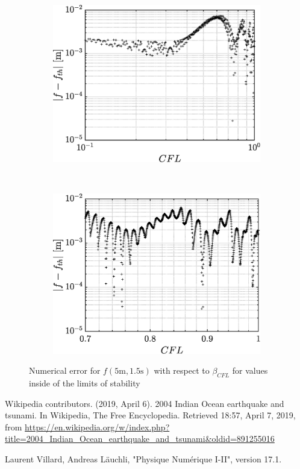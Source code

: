 \documentclass[a4paper,12pt,twoside]{article}
\begin{document}
    \begin{figure}[h]
     \begin{subfigure}{0.5\textwidth}
     \includegraphics[width=\textwidth]{graphs/convCFL01.eps}
     \end{subfigure}
     ~
     \begin{subfigure}{0.5\textwidth}
     \includegraphics[width=\textwidth]{graphs/convCFL01zoom.eps}
     \end{subfigure}
     \caption{Numerical error for $f(5\text{m},1.5\text{s})$ with respect to $\beta_{CFL}$ for values inside of the limits of stability}
     \label{fig:stable}

    \end{figure}




  \newpage
  \begin{thebibliography}{99}
     Wikipedia contributors. (2019, April 6). 2004 Indian Ocean earthquake and tsunami. In Wikipedia, The Free Encyclopedia. Retrieved 18:57, April 7, 2019, from \url{https://en.wikipedia.org/w/index.php?title=2004_Indian_Ocean_earthquake_and_tsunami&oldid=891255016}

     Laurent Villard, Andreas Läuchli, "Physique Numérique I-II", version 17.1.


  \end{thebibliography}
\end{document}
